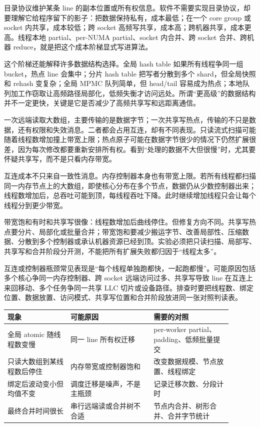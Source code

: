 目录协议维护某条 line 的副本位置或所有权信息。软件不需要实现目录协议，却要理解它给程序留下的影子：把数据保持私有，成本最低；在一个 core group 或 socket 内共享，成本较低；跨 socket 高频写共享，成本高；跨机器共享，成本更高。线程本地 partial、per-NUMA partial、socket 内合并、跨 socket 合并、跨机器 reduce，就是把这个成本阶梯显式写进算法。

这个阶梯还能解释许多数据结构选择。全局 hash table 如果所有线程争同一组 bucket，热点 line 会集中；分片 hash table 把写者分散到多个 shard，但全局快照和 rehash 变复杂；全局 MPMC 队列简单，但 head/tail 容易成为热点；本地队列加工作窃取让高频路径局部化，低频失衡才访问远处。所谓“更高级”的数据结构并不一定更快，关键是它是否减少了高频共享写和远距离通信。

一次远端读取大数组，主要传输的是数据字节；一次共享写热点，传输的不只是数据，还有权限和失效消息。二者都会占用互连，却有不同表现。只读流式扫描可能随着线程数增加撞上带宽上限；热点原子可能在数据字节很少的情况下仍然扩展很差，因为每次修改都要重新安排所有权。看到“处理的数据不大但很慢”时，尤其要怀疑共享写，而不是只看内存带宽。

互连成本不只来自一致性消息。内存控制器本身也有带宽上限。若所有线程都扫描同一内存节点上的大数组，即使核心分布在多个节点，数据仍从少数控制器出来；线程数增加后，总吞吐可能到顶，每线程吞吐下降。此时继续增加线程只会让每个线程分到更少带宽。

带宽饱和有时和共享写很像：线程数增加后曲线停住。但修复方向不同。共享写热点要分片、局部化或批量合并；带宽饱和要减少搬运字节、改善局部性、压缩数据、分散到多个控制器或承认机器资源已经到顶。实验必须把只读扫描、局部写、共享写和合并阶段分开测，不能把所有扩展失败都归因于“线程太多”。

互连或控制器瓶颈常见表现是“每个线程单独跑都快，一起跑都慢”。可能原因包括多个核心争同一内存控制器、跨 socket 远端访问过多、共享写导致 line 在互连上来回移动、多个任务争同一共享 LLC 切片或设备路径。排查时要把线程数、绑定位置、数据放置、访问模式、共享写位置和合并阶段放进同一张对照判读表。

\begin{center}
\begin{tabular}{p{0.25\linewidth}p{0.33\linewidth}p{0.31\linewidth}}
\toprule
现象 & 可能原因 & 需要的对照 \\
\midrule
全局 atomic 随线程数变慢 & 同一 line 所有权迁移 & per-worker partial、padding、低频批量提交 \\
只读大数组到某线程数后停住 & 内存带宽或控制器饱和 & 改变数据规模、节点放置、线程绑定 \\
绑定后波动变小但均值不变 & 调度迁移是噪声，不是主瓶颈 & 记录迁移次数、分段计时 \\
最终合并时间很长 & 串行远端读或合并树不合适 & 节点内合并、树形合并、合并字节统计 \\
\bottomrule
\end{tabular}
\end{center}

